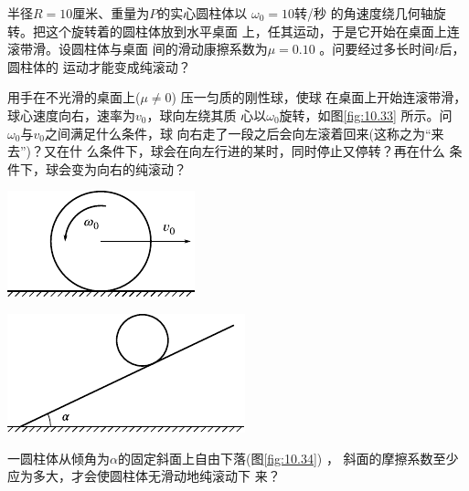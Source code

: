 \begin{exercises}
\exercise 半径$  R = 1 0   $厘米、重量为$ P $的实心圆柱体以 $ \omega _ { 0 } = 1 0   $转/秒
的角速度绕几何轴旋转。把这个旋转着的圆柱体放到水平桌面
上，任其运动，于是它开始在桌面上连滚带滑。设圆柱体与桌面
间的滑动康擦系数为$  \mu = 0 . 1 0  $ 。问要经过多长时间$ t $后，圆柱体的
运动才能变成纯滚动？

\exercise 用手在不光滑的桌面上($  \mu \ne 0  $)  压一匀质的刚性球，使球
在桌面上开始连滚带滑，球心速度向右，速率为$  v _ { 0 }   $，球向左绕其质
心以$  \omega _ { 0 }   $旋转，如图\ref{fig:10.33} 所示。问 $ \omega _ { 0 }   $与$  v _ { 0 }   $之间满足什么条件，球
向右走了一段之后会向左滚着回来(这称之为“来去”)？又在什
么条件下，球会在向左行进的某时，同时停止又停转？再在什么
条件下，球会变为向右的纯滚动？

\begin{figurex}
    \begin{minipage}{0.4\linewidth}
        \centering
        \includegraphics{figure/fig10.33}
        \caption{}
        \label{fig:10.33}
    \end{minipage}
    \begin{minipage}{0.6\linewidth}
        \centering
        \includegraphics{figure/fig10.34}
        \caption{}
        \label{fig:10.34}
    \end{minipage}
\end{figurex}

\exercise 一圆柱体从倾角为$ \alpha $的固定斜面上自由下落(图\ref{fig:10.34}) ，
斜面的摩擦系数至少应为多大，才会使圆柱体无滑动地纯滚动下
来？

\end{exercises}